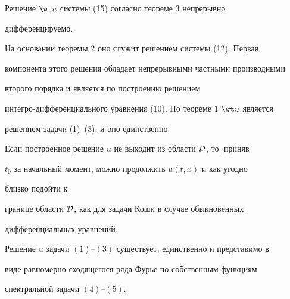  


\begin{pf} 


Решение $\wt u$ системы (15) согласно теореме 3 непрерывно 


дифференцируемо. 


На основании теоремы 2 оно служит решением системы (12). Первая 


компонента этого решения обладает непрерывными частными производными 


второго порядка и является по построению решением 


интегро-дифференциального уравнения (10). По теореме 1 $\wt u$ является 


решением задачи (1)--(3), и оно единственно. 


\end{pf} 


 


\begin{note} 


Если построенное решение $u$ не выходит из области $\cal D$, то, приняв 


$t_0$ за начальный момент, можно продолжить $u(t,x)$ и как угодно 


близко подойти к 


границе области $\cal D$, как для задачи Коши в случае обыкновенных 


дифференциальных уравнений. 


\end{note} 


 


\begin{thm} 


Решение $u$ задачи $(1)$--$(3)$ существует, единственно и представимо в 


виде равномерно сходящегося ряда Фурье по собственным функциям 


спектральной задачи $(4)$--$(5)$. 


\end{thm} 


 


